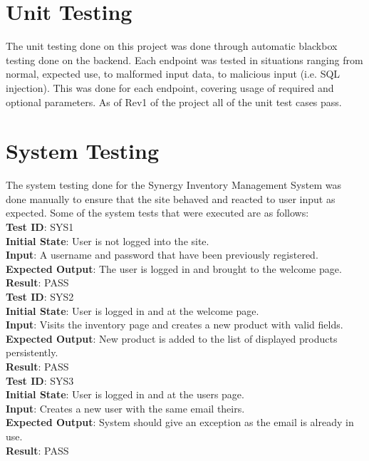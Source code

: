 \documentclass[12pt, titlepage]{article}
\begin{document}
\section{Unit Testing}
\label{sec:unittesting}
The unit testing done on this project was done through automatic blackbox testing done on the backend. Each endpoint was tested in situations ranging from normal, expected use, to malformed input data, to malicious input (i.e. SQL injection). This was done for each endpoint, covering usage of required and optional parameters. As of Rev1 of the project all of the unit test cases pass.


\section{System Testing}
The system testing done for the Synergy Inventory Management System was done manually to ensure that the site behaved and reacted to user input as expected. Some of the system tests that were executed are as follows:\\

\noindent
\textbf{Test ID}: SYS1\\
\textbf{Initial State}: User is not logged into the site.\\
\textbf{Input}: A username and password that have been previously registered.\\
\textbf{Expected Output}: The user is logged in and brought to the welcome page.\\
\textbf{Result}: PASS\\

\noindent
\textbf{Test ID}: SYS2\\
\textbf{Initial State}: User is logged in and at the welcome page.\\
\textbf{Input}: Visits the inventory page and creates a new product with valid fields.\\
\textbf{Expected Output}: New product is added to the list of displayed products persistently.\\
\textbf{Result}: PASS\\

\noindent
\textbf{Test ID}: SYS3\\
\textbf{Initial State}: User is logged in and at the users page.\\
\textbf{Input}: Creates a new user with the same email theirs.\\
\textbf{Expected Output}: System should give an exception as the email is already in use.\\
\textbf{Result}: PASS\\
\end{document}
